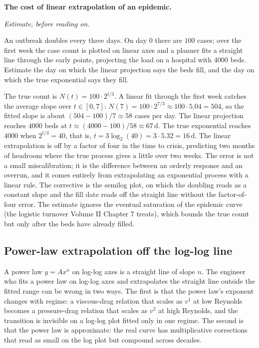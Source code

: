 \begin{estimation}
\textbf{The cost of linear extrapolation of an epidemic.}

\smallskip
\textit{Estimate, before reading on.}

\smallskip
An outbreak doubles every three days. On day $0$ there are $100$
cases; over the first week the case count is plotted on linear axes
and a planner fits a straight line through the early points,
projecting the load on a hospital with $4000$ beds. Estimate the day
on which the linear projection says the beds fill, and the day on
which the true exponential says they fill.

The true count is $N(t) = 100 \cdot 2^{t/3}$. A linear fit through
the first week catches the average slope over $t \in [0, 7]$:
$N(7) = 100 \cdot 2^{7/3} \approx 100 \cdot 5.04 = 504$, so the
fitted slope is about $(504 - 100)/7 \approx 58$ cases per day. The
linear projection reaches $4000$ beds at $t \approx (4000 - 100)/58
\approx 67\,\si{\day}$. The true exponential reaches $4000$ when
$2^{t/3} = 40$, that is, $t = 3 \log_{2}(40) = 3 \cdot 5.32 =
16\,\si{\day}$. The linear extrapolation is off by a factor of four
in the time to crisis, predicting two months of headroom where the
true process gives a little over two weeks. The error is not a small
miscalibration; it is the difference between an orderly response and
an overrun, and it comes entirely from extrapolating an exponential
process with a linear rule. The corrective is the semilog plot, on
which the doubling reads as a constant slope and the fill date reads
off the straight line without the factor-of-four error. The estimate
ignores the eventual saturation of the epidemic curve (the logistic
turnover Volume II Chapter 7 treats), which bounds the true count but
only after the beds have already filled.
\end{estimation}

\subsection{Power-law extrapolation off the log-log line}

A power law $y = A x^{n}$ on log-log axes is a straight line of slope
$n$. The engineer who fits a power law on log-log axes and
extrapolates the straight line outside the fitted range can be wrong
in two ways. The first is that the power law's exponent changes with
regime: a viscous-drag relation that scales as $v^{1}$ at low Reynolds
becomes a pressure-drag relation that scales as $v^{2}$ at high
Reynolds, and the transition is invisible on a log-log plot fitted
only in one regime. The second is that the power law is approximate:
the real curve has multiplicative corrections that read as small on
the log plot but compound across decades.


